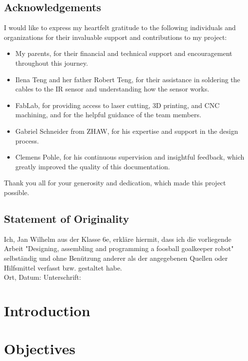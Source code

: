 \documentclass[11pt,openany, english]{book}
\newcommand{\bottompage}{-- \thepage\ --}
\begin{document}
    \section*{Acknowledgements}
    I would like to express my heartfelt gratitude to the following individuals and organizations for their invaluable support and contributions to my project:
    \begin{itemize}
        \item My parents, for their financial and technical support and encouragement throughout this journey.
        \item Ilena Teng and her father Robert Teng, for their assistance in soldering the cables to the IR sensor and understanding how the sensor works.
        \item FabLab, for providing access to laser cutting, 3D printing, and CNC machining, and for the helpful guidance of the team members.
        \item Gabriel Schneider from ZHAW, for his expertise and support in the design process.
        \item Clemens Pohle, for his continuous supervision and insightful feedback, which greatly improved the quality of this documentation.
    \end{itemize}
    Thank you all for your generosity and dedication, which made this project possible.

    \vspace{1cm}
    \section*{Statement of Originality}
    Ich, Jan Wilhelm aus der Klasse 6e, erkläre hiermit, dass ich die vorliegende Arbeit "Designing, assembling and programming a foosball goalkeeper robot" selbständig und ohne Benützung anderer als der angegebenen Quellen oder Hilfsmittel verfasst bzw. gestaltet habe.
    \vspace{0.5cm}\\
    Ort, Datum: \hspace{6cm} Unterschrift:


    \chapter{Introduction}\label{ch:introduction}
    \renewcommand{\bottompage}{-- \thepage\ --}
    \setcounter{page}{1}
    


    \chapter{Objectives}\label{ch:objectives}
    
\end{document}
